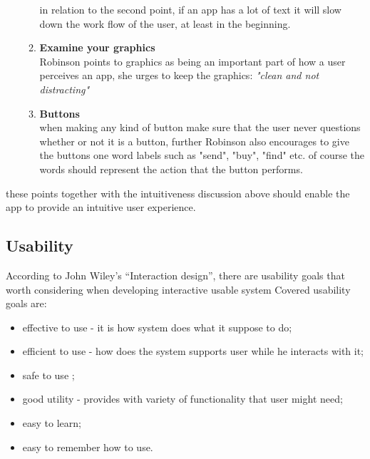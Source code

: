 \begin{itemize}
\begin{enumerate}
 in relation to the second point, if an app has a lot of text it will slow down the work flow of the user, at least in the beginning.
 \item \textbf{Examine your graphics}\\
 Robinson points to graphics as being an important part of how a user perceives an app, she urges to keep the graphics: \textit{"clean and not distracting"} 
 \item \textbf{Buttons}\\
 when making any kind of button make sure that the user never questions whether or not it is a button, further Robinson also encourages to give the buttons one word labels such as "send", "buy", "find" etc. of course the words should represent the action that the button performs.
 \end{enumerate}\cite{UXKeys} 
\end{itemize} 
these points together with the intuitiveness discussion above should enable the app to provide an intuitive user experience. 

\subsection{Usability}
According to John Wiley’s “Interaction design”, there are usability goals that worth considering when developing interactive usable system \cite {Wiley} Covered usability goals are:
\begin{itemize}
\item effective to use - it is how system does what it suppose to do;
\item efficient to use - how does the system supports user while he interacts 	with it;
\item safe to use ;
\item good utility - provides with variety of functionality that user might need; 
\item easy to learn;
\item easy to remember how to use.
\end{itemize}

